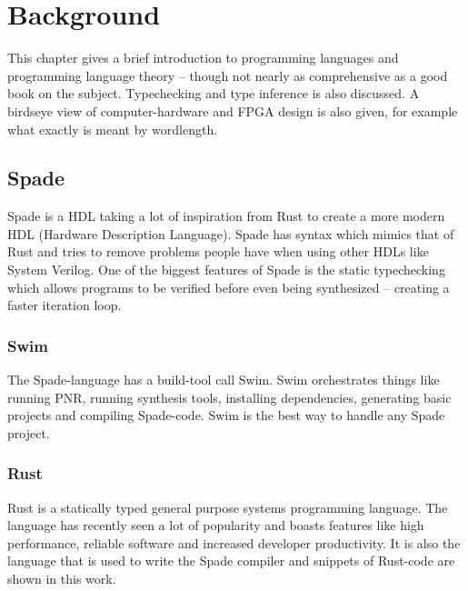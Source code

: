 \chapter{Background}
\label{chaBackground}
This chapter gives a brief introduction to programming languages and programming language theory -- though not nearly as comprehensive as a good book on the subject. Typechecking and type inference is also discussed. A birdseye view of computer-hardware and FPGA design is also given, for example what exactly is meant by wordlength.

% 

\section{Spade}
Spade is a HDL taking a lot of inspiration from Rust to create a more modern HDL (Hardware Description Language). Spade has syntax which mimics that of Rust and tries to remove problems people have when using other HDLs like System Verilog. One of the biggest features of Spade is the static typechecking which allows programs to be verified before even being synthesized -- creating a faster iteration loop.
\cite{src:spadeSomething} \cite{src:spadeAnHDL}

\subsection{Swim}
The Spade-language has a build-tool call Swim. Swim orchestrates things like running PNR, running synthesis tools, installing dependencies, generating basic projects and compiling Spade-code. Swim is the best way to handle any Spade project.

\subsection{Rust}
Rust is a statically typed general purpose systems programming language. The language has recently seen a lot of popularity and boasts features like high performance, reliable software and increased developer productivity. It is also the language that is used to write the Spade compiler and snippets of Rust-code are shown in this work. \cite{src:Rust}

